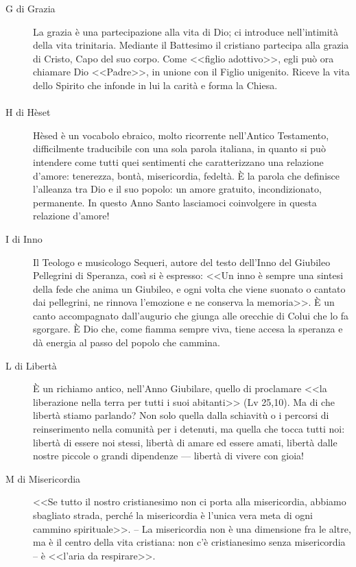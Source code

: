 \begin{description}
  \item[G di Grazia] La grazia è una partecipazione alla vita di Dio; ci introduce nell'intimità della vita trinitaria. Mediante il Battesimo il cristiano partecipa alla grazia di Cristo, Capo del suo corpo. Come <<figlio adottivo>>, egli può ora chiamare Dio <<Padre>>, in unione con il Figlio unigenito. Riceve la vita dello Spirito che infonde in lui la carità e forma la Chiesa.
\end{description}

\paragraph{}
\vspace*{-\parskip}

\begin{description}

  \item[H di Hèset] Hèsed è un vocabolo ebraico, molto ricorrente nell'Antico Testamento, difficilmente traducibile con una sola parola italiana, in quanto si può intendere come tutti quei sentimenti che caratterizzano una relazione d'amore: tenerezza, bontà, misericordia, fedeltà. È la parola che definisce l'alleanza tra Dio e il suo popolo: un amore gratuito, incondizionato, permanente. In questo Anno Santo lasciamoci coinvolgere in questa relazione d'amore!
\end{description}

\begin{description}
  \item[I di Inno] Il Teologo e musicologo Sequeri, autore del testo dell'Inno del Giubileo Pellegrini di Speranza, così si è espresso: <<Un inno è sempre una sintesi della fede che anima un Giubileo, e ogni volta che viene suonato o cantato dai pellegrini, ne rinnova l'emozione e ne conserva la memoria>>. È un canto accompagnato dall'augurio che giunga alle orecchie di Colui che lo fa sgorgare. È Dio che, come fiamma sempre viva, tiene accesa la speranza e dà energia al passo del popolo che cammina.

  \item[L di Libertà] È un richiamo antico, nell'Anno Giubilare, quello di proclamare <<la liberazione nella terra per tutti i suoi abitanti>> (Lv 25,10). Ma di che libertà stiamo parlando? Non solo quella dalla schiavitù o i percorsi di reinserimento nella comunità per i detenuti, ma quella che tocca tutti noi: libertà di essere noi stessi, libertà di amare ed essere amati, libertà dalle nostre piccole o grandi dipendenze --- libertà di vivere con gioia!

  \item[M di Misericordia] <<Se tutto il nostro cristianesimo non ci porta alla misericordia, abbiamo sbagliato strada, perché la misericordia è l'unica vera meta di ogni cammino spirituale>>. -- La misericordia non è una dimensione fra le altre, ma è il centro della vita cristiana: non c'è cristianesimo senza misericordia -- è <<l'aria da respirare>>.
\end{description}
